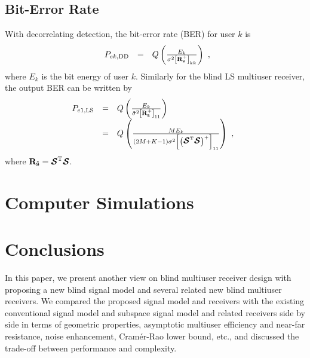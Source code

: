 \documentclass[a4paper,10pt,fleqn, twocolumn]{IEEETran}
\newcommand{\bs}{{\bf s}}
\newcommand{\bR}{{\bf R}}
\newcommand{\bcS}{{\mbox {\boldmath ${\cal S}$}}}
\begin{document}
\subsection{Bit-Error Rate}
With decorrelating detection, the bit-error rate (BER) for user
$k$ is
\begin{equation}
\begin{array}{rcl}
P_{ek,\rm\small DD} &=&
Q\left(\frac{E_{k}}{\sigma^{2}\left[\bR_{\bs}^{+}\right]_{kk}}\right)
\end{array},\label{BER_DD}
\end{equation}
\noindent where $E_{k}$ is the bit energy of user $k$. Similarly
for the blind LS multiuser receiver, the output BER can be written
by
\begin{equation}\hspace{-0.07in}
\begin{array}{rcl}
P_{e1,\rm\small LS} &=&
Q\left(\frac{E_{k}}{\tilde\sigma^{2}\left[\bR_{\tilde\bs}^{+}\right]_{11}}\right)\\
&=&
Q\left(\frac{ME_{k}}{\left(2M+K-1\right)\sigma^{2}\left[\left(\bcS^{\rm
T}\bcS\right)^{+}\right]_{11}}\right)\ ,
\end{array}\label{BER_LS}
\end{equation}
\noindent where $\bR_{\tilde\bs}=\bcS^{\rm T}\bcS$.

\section{Computer Simulations}
\section{Conclusions}
In this paper, we present another view on blind multiuser receiver
design with proposing a new blind signal model and several related
new blind multiuser receivers. We compared the proposed signal
model and receivers with the existing conventional signal model
and subspace signal model and related receivers side by side in
terms of geometric properties, asymptotic multiuser efficiency and
near-far resistance, noise enhancement, Cram\'{e}r-Rao lower
bound, etc., and discussed the trade-off between performance and
complexity.

\small


\end{document}
